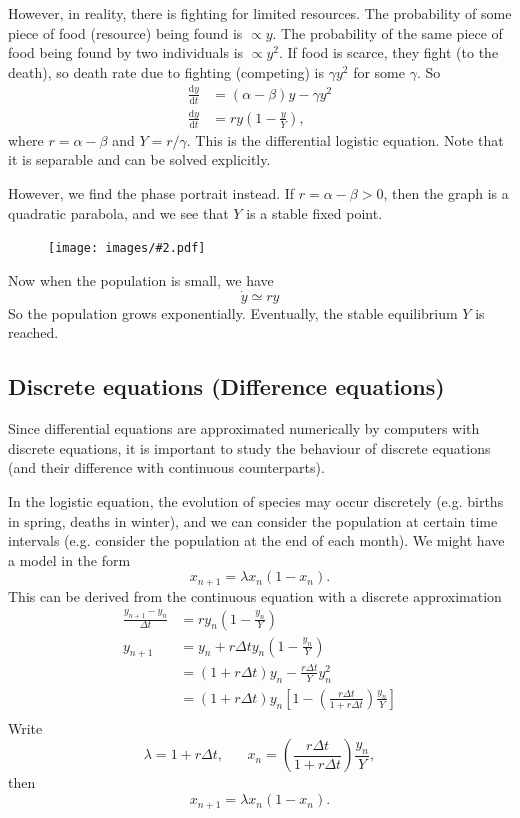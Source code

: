 \documentclass[a4paper]{article}
\theoremstyle{definition}
\renewcommand{\d}{\mathrm{d}}
\newcommand{\img}[2][]{\begin{figure}[ht]\centering\texttt{[image: images/\#2.pdf]}\end{figure}}
\begin{document}
However, in reality, there is fighting for limited resources. The probability of some piece of food (resource) being found is $\propto y$. The probability of the same piece of food being found by two individuals is $\propto y^2$. If food is scarce, they fight (to the death), so death rate due to fighting (competing) is $\gamma y^2$ for some $\gamma$. So
\begin{align*}
  \frac{\d y}{\d t} &= (\alpha - \beta)y - \gamma y^2\\
  \frac{\d y}{\d t}&= ry \left(1 - \frac{y}{Y}\right),
\end{align*}
where $r = \alpha - \beta$ and $Y = r/\gamma$. This is the differential logistic equation. Note that it is separable and can be solved explicitly.

However, we find the phase portrait instead. If $r = \alpha - \beta > 0$, then the graph is a quadratic parabola, and we see that $Y$ is a stable fixed point.

\img{de_9}

Now when the population is small, we have
\[
\dot y \simeq ry
\]
So the population grows exponentially. Eventually, the stable equilibrium $Y$ is reached.

\subsection{Discrete equations (Difference equations)}
Since differential equations are approximated numerically by computers with discrete equations, it is important to study the behaviour of discrete equations (and their difference with continuous counterparts).

In the logistic equation, the evolution of species may occur discretely (e.g. births in spring, deaths in winter), and we can consider the population at certain time intervals (e.g. consider the population at the end of each month). We might have a model in the form
\[
x_{n + 1} = \lambda x_n(1 - x_n).
\]
This can be derived from the continuous equation with a discrete approximation
\begin{align*}
  \frac{y_{n+1} - y_n}{\Delta t} &= ry_n\left(1 - \frac{y_n}{Y}\right)\\
  y_{n + 1} &= y_n + r\Delta ty_n\left(1 - \frac{y_n}{Y}\right)\\
  &= (1 + r\Delta t)y_n - \frac{r\Delta t}{Y}y_n^2\\
  &= (1 + r\Delta t)y_n\left[1 - \left(\frac{r\Delta t}{1 + r\Delta t}\right)\frac{y_n}{Y}\right]\\
\end{align*}
Write
\[
\lambda = 1 + r\Delta t,\;\;\;\;\;\; x_n = \left(\frac{r\Delta t}{1 + r\Delta t}\right)\frac{y_n}{Y},
\]
then
\[
x_{n+1}=\lambda x_n(1 - x_n).
\]
\end{document}
